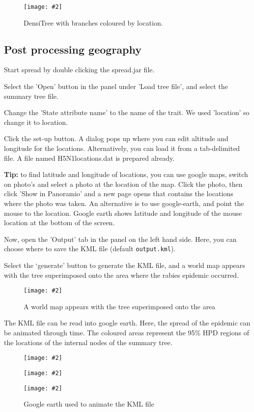 \documentclass{article}
\newcommand{\includeimage}[2][]{%
\texttt{[image: \#2]}
}
\begin{document}
\begin{figure}
\centering
\includeimage[scale=0.4]{figures/DensiTree2}
\caption{DensiTree with branches coloured by location.}
\label{fig.DensiTree2} 
\end{figure}

\subsection*{Post processing geography}

Start spread by double clicking the spread.jar file.

Select the 'Open' button in the panel under 'Load tree file', and select the summary tree file.

Change the 'State attribute name' to the name of the trait. We used 'location' so change it to location.

Click the set-up button. A dialog pops up where you can edit altitude and longitude for the locations. 
Alternatively, you can load it from a tab-delimited file. A file named H5N1locations.dat is prepared already.

{\bf Tip:} to find latitude and longitude of locations, you can 
use google maps, switch on photo's and select a photo at the location 
of the map. Click the photo, then click 'Show in Panoramio' and a 
new page opens that contains the locations where the photo was taken.
An alternative is to use google-earth, and point the mouse to the 
location. Google earth shows latitude and longitude of the mouse 
location at the bottom of the screen.

Now, open the 'Output' tab in the panel on the left hand side. Here, you can choose where to save the KML file (default {\tt output.kml}).

Select the `generate' button to generate the KML file, and a world map appears with the tree superimposed onto the area where the rabies epidemic occurred.

\begin{figure}
\centering
\includeimage[scale=0.3]{figures/spread}
\caption{A world map appears with the tree superimposed onto the area}
\label{fig.DensiTree2} 
\end{figure}

The KML file can be read into google earth. Here, the spread of the epidemic can be animated through time. The coloured areas represent the 95\% HPD regions of the locations of the internal nodes of the summary tree.

\begin{figure}
\centering
\includeimage[scale=0.2]{figures/google-earth0}
\includeimage[scale=0.2]{figures/google-earth1}
\includeimage[scale=0.4]{figures/google-earth2}
\caption{Google earth used to animate the KML file}
\label{fig.ge}
\end{figure}



\end{document}
